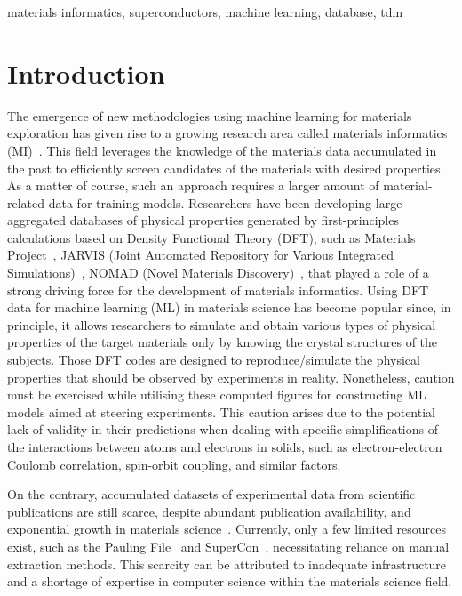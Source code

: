 \documentclass[]{interact}
\theoremstyle{plain} %
\theoremstyle{definition}
\theoremstyle{remark}
\begin{document}
\begin{keywords}
    materials informatics, superconductors, machine learning, database, tdm
\end{keywords}


\section{Introduction}
The emergence of new methodologies using machine learning for materials exploration has given rise to a growing research area called materials informatics (MI)~\cite{10.3389/fchem.2022.930369}.
This field leverages the knowledge of the materials data accumulated in the past to efficiently screen candidates of the materials with desired properties.
As a matter of course, such an approach requires a larger amount of material-related data for training models.
Researchers have been developing large aggregated databases of physical properties generated by first-principles calculations based on Density Functional Theory (DFT), such as Materials Project~\cite{materialsprojectJain2013}, JARVIS (Joint Automated Repository for Various Integrated Simulations)~\cite{aflowcurtarolo2012aflow}, NOMAD (Novel Materials Discovery)~\cite{nomad}, that played a role of a strong driving force for the development of materials informatics. 
Using DFT data for machine learning (ML) in materials science has become popular since, in principle, it allows researchers to simulate and obtain various types of physical properties of the target materials only by knowing the crystal structures of the subjects. 
Those DFT codes are designed to reproduce/simulate the physical properties that should be observed by experiments in reality.
Nonetheless, caution must be exercised while utilising these computed figures for constructing ML models aimed at steering experiments. 
This caution arises due to the potential lack of validity in their predictions when dealing with specific simplifications of the interactions between atoms and electrons in solids, such as electron-electron Coulomb correlation, spin-orbit coupling, and similar factors.

On the contrary, accumulated datasets of experimental data from scientific publications are still scarce, despite abundant publication availability, and exponential growth in materials science~\cite{Pratheepan_2019}.
Currently, only a few limited resources exist, such as the Pauling File~\cite{Blokhin2018ThePF_paulingFile} and SuperCon~\cite{ishii2023structuring}, necessitating reliance on manual extraction methods. 
This scarcity can be attributed to inadequate infrastructure and a shortage of expertise in computer science within the materials science field.
\end{document}
